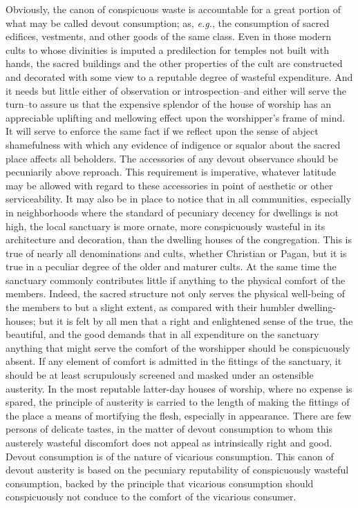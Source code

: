 \documentclass[12pt]{report}
\begin{document}
Obviously, the canon of conspicuous waste is accountable for a great
portion of what may be called devout consumption; as, \emph{e.g.}, the
consumption of sacred edifices, vestments, and other goods of the same
class. Even in those modern cults to whose divinities is imputed a
predilection for temples not built with hands, the sacred buildings and
the other properties of the cult are constructed and decorated with some
view to a reputable degree of wasteful expenditure. And it needs but
little either of observation or introspection--and either will serve the
turn--to assure us that the expensive splendor of the house of worship
has an appreciable uplifting and mellowing effect upon the worshipper's
frame of mind. It will serve to enforce the same fact if we reflect upon
the sense of abject shamefulness with which any evidence of indigence or
squalor about the sacred place affects all beholders. The accessories
of any devout observance should be pecuniarily above reproach. This
requirement is imperative, whatever latitude may be allowed with regard
to these accessories in point of aesthetic or other serviceability. It
may also be in place to notice that in all communities, especially in
neighborhoods where the standard of pecuniary decency for dwellings
is not high, the local sanctuary is more ornate, more conspicuously
wasteful in its architecture and decoration, than the dwelling houses
of the congregation. This is true of nearly all denominations and cults,
whether Christian or Pagan, but it is true in a peculiar degree of
the older and maturer cults. At the same time the sanctuary commonly
contributes little if anything to the physical comfort of the members.
Indeed, the sacred structure not only serves the physical well-being
of the members to but a slight extent, as compared with their humbler
dwelling-houses; but it is felt by all men that a right and enlightened
sense of the true, the beautiful, and the good demands that in all
expenditure on the sanctuary anything that might serve the comfort of
the worshipper should be conspicuously absent. If any element of comfort
is admitted in the fittings of the sanctuary, it should be at least
scrupulously screened and masked under an ostensible austerity. In the
most reputable latter-day houses of worship, where no expense is spared,
the principle of austerity is carried to the length of making the
fittings of the place a means of mortifying the flesh, especially in
appearance. There are few persons of delicate tastes, in the matter of
devout consumption to whom this austerely wasteful discomfort does not
appeal as intrinsically right and good. Devout consumption is of the
nature of vicarious consumption. This canon of devout austerity is based
on the pecuniary reputability of conspicuously wasteful consumption,
backed by the principle that vicarious consumption should conspicuously
not conduce to the comfort of the vicarious consumer.
\end{document}
